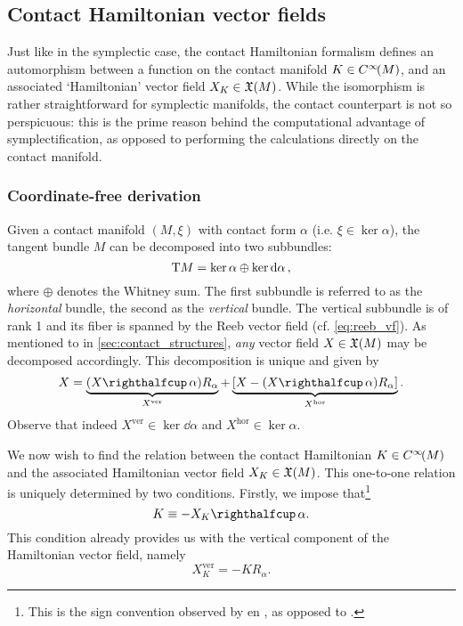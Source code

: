 \subsection{Contact Hamiltonian vector fields}
\label{ssec:contact_ham_vfields}
Just like in the symplectic case, the contact Hamiltonian formalism defines an automorphism between a function on the contact manifold \(K \in C^\infty\!\qty(M)\), and an associated `Hamiltonian' vector field \(X_K \in \mathfrak{X}\qty(M)\). While the isomorphism is rather straightforward for symplectic manifolds, the contact counterpart is not so perspicuous: this is the prime reason behind the computational advantage of symplectification, as opposed to performing the calculations directly on the contact manifold.

\subsubsection{Coordinate-free derivation} Given a contact manifold \((M, \xi)\) with contact form \(\alpha\) (i.e. \(\xi \in \ker \alpha\)), the tangent bundle \(M\) can be decomposed into two subbundles: \cite{Libermann1987,Cannas2001}
\begin{equation}
     \mathrm{T}M = \ker \alpha \oplus \ker \dd{\alpha},
\end{equation}
where \(\oplus\) denotes the Whitney sum. The first subbundle is referred to as the \emph{horizontal} bundle, the second as the \emph{vertical}
 bundle. The vertical subbundle is of rank 1 and its fiber is spanned by the Reeb vector field (cf. \cref{eq:reeb_vf}). As mentioned to in \cref{sec:contact_structures}, \emph{any} vector field \(X \in \mathfrak{X}\qty(M)\) may be decomposed accordingly. This decomposition is unique and given by
\begin{equation}
    X = \underbrace{(\intpr{X}{\alpha})R_\alpha}_{X^\text{ver}} + \underbrace{\qty[X - (\intpr{X}{\alpha})R_\alpha]}_{X^\text{hor}}.
    \label{eq:contact_vf_decomp}
\end{equation}
Observe that indeed \(X^\text{ver} \in \ker \dd{\alpha}\) and \(X^\text{hor} \in \ker \alpha\). \cite{Cannas2001,DeLeon2020,Libermann1987}

We now wish to find the relation between the contact Hamiltonian \(K \in C^\infty\!\qty(M)\) and the associated Hamiltonian vector field \(X_K \in \mathfrak{X}\qty(M)\). This one-to-one relation is uniquely determined by two conditions. Firstly, we impose that\footnote{This is the sign convention observed by \citet{Bravetti2017} en \citet{VanderSchaft2021a}, as opposed to \citet{Libermann1987}.}
    \begin{equation}
     K \equiv -\intpr{X_K}{\alpha}.
\end{equation}
This condition already provides us with the vertical component of the Hamiltonian vector field, namely
\begin{equation}
     X_K^\text{ver} = -K R_\alpha.
\end{equation}

